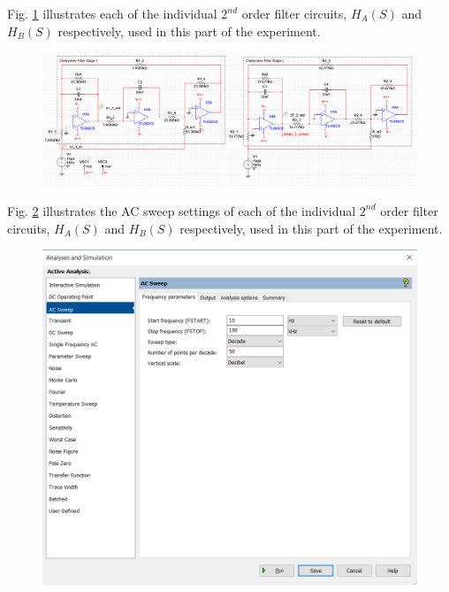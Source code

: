 \documentclass[hidelinks]{article}
\begin{document}
	\pagebreak
	\noindent Fig. \ref{f:circuit2} illustrates each of the individual $2^{nd}$ order filter circuits, $H_A(S)$ and $H_B(S)$ respectively, used in this part of the experiment.
	\begin{figure}[htbp]
		\centering
		\includegraphics[width=0.65\textheight]{circuit2.png}
		\label{f:circuit2}
	\end{figure}
	
	\noindent Fig. \ref{f:settings1} illustrates the AC sweep settings of each of the individual $2^{nd}$ order filter circuits, $H_A(S)$ and $H_B(S)$ respectively, used in this part of the experiment.
	\begin{figure}[htbp]
		\centering
		\includegraphics[width=0.65\linewidth]{sim_settings1.png}
		\label{f:settings1}
	\end{figure}	
	
\end{document}
